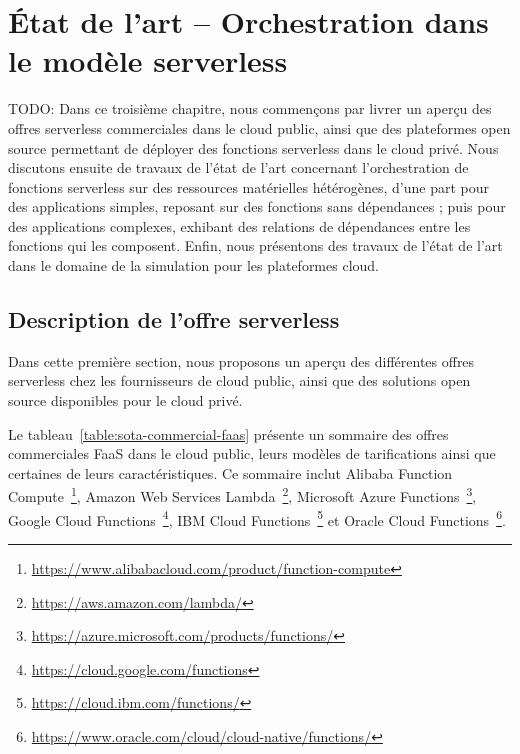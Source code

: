 \chapter{État de l'art -- Orchestration dans le modèle serverless}
\label{chapter:sota}

TODO: Dans ce troisième chapitre, nous commençons par livrer un aperçu des offres serverless commerciales dans le cloud public, ainsi que des plateformes open source permettant de déployer des fonctions serverless dans le cloud privé.
Nous discutons ensuite de travaux de l'état de l'art concernant l'orchestration de fonctions serverless sur des ressources matérielles hétérogènes, d'une part pour des applications simples, reposant sur des fonctions sans dépendances ; puis pour des applications complexes, exhibant des relations de dépendances entre les fonctions qui les composent. Enfin, nous présentons des travaux de l'état de l'art dans le domaine de la simulation pour les plateformes cloud.

\section{Description de l'offre serverless}
\label{section:sota-offerings}

Dans cette première section, nous proposons un aperçu des différentes offres serverless chez les fournisseurs de cloud public, ainsi que des solutions open source disponibles pour le cloud privé.

Le tableau~\ref{table:sota-commercial-faas} présente un sommaire des offres commerciales \gls{FaaS} dans le cloud public, leurs modèles de tarifications ainsi que certaines de leurs caractéristiques. Ce sommaire inclut Alibaba Function Compute~\footnote{\label{footnote:alibaba-function}\href{https://www.alibabacloud.com/product/function-compute}{https://www.alibabacloud.com/product/function-compute}}, Amazon Web Services Lambda~\footnote{\label{footnote:aws-lambda}\href{https://aws.amazon.com/lambda/}{https://aws.amazon.com/lambda/}}, Microsoft Azure Functions~\footnote{\label{footnote:azure-functions}\href{https://azure.microsoft.com/products/functions/}{https://azure.microsoft.com/products/functions/}}, Google Cloud Functions~\footnote{\label{footnote:google-functions}\href{https://cloud.google.com/functions}{https://cloud.google.com/functions}}, IBM Cloud Functions~\footnote{\label{footnote:ibm-functions}\href{https://cloud.ibm.com/functions/}{https://cloud.ibm.com/functions/}} et Oracle Cloud Functions~\footnote{\label{footnote:oracle-functions}\href{https://www.oracle.com/cloud/cloud-native/functions/}{https://www.oracle.com/cloud/cloud-native/functions/}}.


